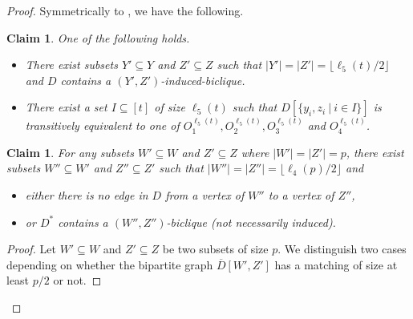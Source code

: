 \documentclass[a4paper,11pt]{article}
\theoremstyle{plain}
\newtheorem{claim}[theorem]{Claim}
\newtheorem{identification rule}{Identification Rule}
\theoremstyle{definition}
\theoremstyle{remark}
\newenvironment{claimproof}{\begin{proof}\renewcommand{\qedsymbol}{\claimqed}}{\end{proof}\renewcommand{\qedsymbol}{\plainqed}}
\let\plainqed\qedsymbol
\newcommand{\claimqed}{$\lrcorner$}
\begin{document}
\begin{proof}
Symmetrically to , we have the following.

\begin{claim}
\label{clm:ramseyB}
One of the following holds.
\begin{itemize}
\item[(1)] There exist subsets $Y' \subseteq Y$ and $Z' \subseteq Z$ such that $|Y'| = |Z'| = \lfloor \ell_5(t)/2 \rfloor$ and $D$ contains a $(Y',Z')$-induced-biclique.
\item[(2)] There exist a set $I \subseteq [t]$ of size $\ell_5(t)$ such that $D[\{y_i,z_i~|~i \in I\}]$ is transitively equivalent to one of $O_1^{\ell_5(t)},O_2^{\ell_5(t)},O_3^{\ell_5(t)}$ and $O_4^{\ell_5(t)}$.
\end{itemize}
\end{claim}

\begin{claim}
\label{clm:ramseyWZ}
For any subsets $W' \subseteq W$ and $Z' \subseteq Z$ where $|W'| = |Z'| = p$, there exist subsets 
$W'' \subseteq W'$ and $Z'' \subseteq Z'$ such that $|W''| = |Z''| = \lfloor \ell_4(p) / 2 \rfloor$ and
\begin{itemize}
\item[$\bullet$] either there is no edge in $D$ from a vertex of $W''$ to a vertex of $Z''$,
\item[$\bullet$] or $D^*$ contains a $(W'',Z'')$-biclique (not necessarily induced).
\end{itemize}
\end{claim}

\begin{claimproof}
Let $W' \subseteq W$ and $Z' \subseteq Z$ be two subsets of size $p$. We distinguish two cases depending on whether the bipartite graph $\overline{D}[W',Z']$ has a matching of size at least $p/2$ or not.


\end{claimproof}
\end{proof}
\end{document}
